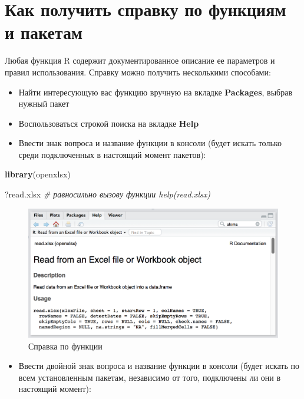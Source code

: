 \documentclass[]{book}
\newenvironment{Shaded}{\begin{snugshade}}{\end{snugshade}}
\newcommand{\KeywordTok}[1]{\textcolor[rgb]{0.13,0.29,0.53}{\textbf{#1}}}
\newcommand{\CommentTok}[1]{\textcolor[rgb]{0.56,0.35,0.01}{\textit{#1}}}
\newcommand{\NormalTok}[1]{#1}
\providecommand{\tightlist}{%
  \setlength{\itemsep}{0pt}\setlength{\parskip}{0pt}}
\begin{document}
\section*{Как получить справку по функциям и пакетам}\label{------}

Любая функция R содержит документированное описание ее параметров и
правил использования. Справку можно получить несколькими способами:

\begin{itemize}
\tightlist
\item
  Найти интересующую вас функцию вручную на вкладке \textbf{Packages},
  выбрав нужный пакет
\item
  Воспользоваться строкой поиска на вкладке \textbf{Help}
\item
  Ввести знак вопроса и название функции в консоли (будет искать только
  среди подключенных в настоящий момент пакетов):
\end{itemize}

\begin{Shaded}
\begin{Highlighting}[]
\KeywordTok{library}\NormalTok{(openxlsx)}

\NormalTok{?read.xlsx }\CommentTok{# равносильно вызову функции help(read.xlsx)}
\end{Highlighting}
\end{Shaded}

\begin{figure}
\centering
\includegraphics{images/ch0_openxlsx.png}
\caption{Справка по функции}
\end{figure}

\begin{itemize}
\tightlist
\item
  Ввести двойной знак вопроса и название функции в консоли (будет искать
  по всем установленным пакетам, независимо от того, подключены ли они в
  настоящий момент):
\end{itemize}
\end{document}
